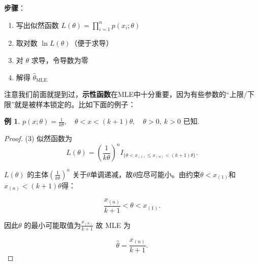 \documentclass[a4paper]{ctexart}
\newtheorem{example}{例}[section]
\begin{document}
\textbf{步骤}：
\begin{enumerate}
    \item 写出似然函数 \(L(\theta) = \prod_{i=1}^n p(x_i; \theta)\)
    \item 取对数 \(\ln L(\theta)\)（便于求导）
    \item 对 \(\theta\) 求导，令导数为零
    \item 解得 \(\hat{\theta}_{\text{MLE}}\)
\end{enumerate}
\begin{tipbox}
    注意我们前面就提到过，\textbf{示性函数}在MLE中十分重要，因为有些参数的“上限/下限”就是被样本锁定的。比如下面的例子：
    \begin{example}
        $p(x; \theta) = \frac{1}{k\theta}, \quad \theta < x < (k+1)\theta, \quad \theta > 0, \ k > 0 \text{ 已知}.$
    \end{example}
    \begin{proof}
        (3) 似然函数为
        \begin{equation}
        L(\theta) = \left( \frac{1}{k\theta} \right)^n I_{\{\theta < x_{(1)} \leq x_{(n)} < (k+1)\theta\}}.
        \end{equation}

        
        $L(\theta)$ 的主体$\left( \frac{1}{k\theta} \right)^n$ 关于$\theta$单调递减，故$ \theta$应尽可能小。由约束$\theta < x_{(1)}$和$x_{(n)} < (k+1)\theta$得：

        \begin{equation}
        \frac{x_{(n)}}{k+1} < \theta < x_{(1)}.
        \end{equation}

        因此$\theta$ 的最小可能取值为$\frac{x_{(n)}}{k+1}$ 故 MLE 为

        \begin{equation}
        \hat{\theta} = \frac{x_{(n)}}{k+1}.
        \end{equation}

    \end{proof}
\end{tipbox}
\end{document}
